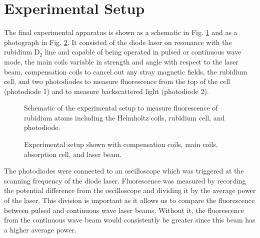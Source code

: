 \section{Experimental Setup}
The final experimental apparatus is shown as a schematic in Fig. \ref{fig:expsetup} and as a photograph in Fig. \ref{fig:expsetupactual}. It consisted of the diode laser on resonance with the rubidium D$_2$ line and capable of being operated in pulsed or continuous wave mode, the main coils variable in strength and angle with respect to the laser beam, compensation coils to cancel out any stray magnetic fields, the rubidium cell, and two photodiodes to measure fluorescence from the top of the cell (photodiode 1) and to measure backscattered light (photodiode 2). 

\begin{figure}[ht]
	\centering
	
	\caption{Schematic of the experimental setup to measure fluorescence of rubidium atoms including the Helmholtz coils, rubidium cell, and photodiode.}
	\label{fig:expsetup}
\end{figure}

\begin{figure}[htpb]
	\centering
	\caption{Experimental setup shown with compensation coils, main coils, absorption cell, and laser beam.}
	\label{fig:expsetupactual}
\end{figure}

The photodiodes were connected to an oscilloscope which was triggered at the scanning frequency of the diode laser. Fluorescence was measured by recording the potential difference from the oscilloscope and dividing it by the average power of the laser. This division is important as it allows us to compare the fluorescence between pulsed and continuous wave laser beams. Without it, the fluorescence from the continuous wave beam would consistently be greater since this beam has a higher average power.

